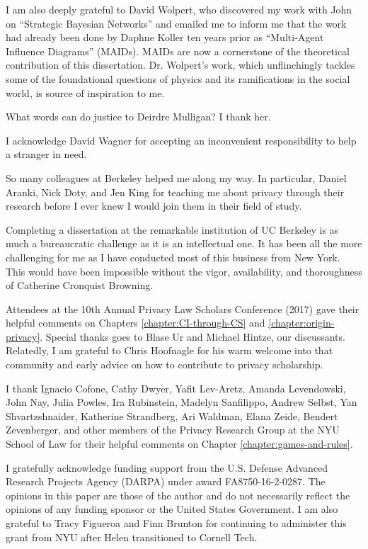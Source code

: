 \documentclass[../thesis.tex]{subfiles}
\begin{document}
 I am also deeply grateful to David Wolpert, who discovered
 my work with John on ``Strategic Bayesian Networks''
 and emailed me to inform me that the work had already
 been done by Daphne Koller ten years prior as
 ``Multi-Agent Influence Diagrams'' (MAIDs).
  MAIDs are now a cornerstone of the theoretical contribution
 of this dissertation.
 Dr. Wolpert's work, which unflinchingly tackles some
 of the foundational questions of physics and its ramifications
 in the social world, is source of inspiration to me.
 
 What words can do justice to Deirdre Mulligan?
 I thank her.

 I acknowledge David Wagner for accepting an
 inconvenient responsibility to help a stranger in need.

 So many colleagues at Berkeley helped me along my way.
 In particular, Daniel Aranki, Nick Doty, and Jen King
 for teaching me about privacy through their research
 before I ever knew I would join them in their field
 of study.

 Completing a dissertation at the remarkable institution
 of UC Berkeley is as much a bureaucratic challenge as it
 is an intellectual one.
 It has been all the more challenging for me as I
 have conducted most of this business from New York.
 This would have been impossible without the vigor,
 availability, and thoroughness of Catherine
 Cronquist Browning.
 
 Attendees at the 10th Annual Privacy Law Scholars Conference
 (2017) gave their helpful comments on
 Chapters \ref{chapter:CI-through-CS} and
 \ref{chapter:origin-privacy}.
 Special thanks goes to Blase Ur and Michael Hintze,
 our discussants.
 Relatedly, I am grateful to Chris Hoofnagle for his warm
 welcome into that community and early advice
 on how to contribute to privacy scholarship.

 I thank Ignacio Cofone, Cathy Dwyer, Yafit Lev-Aretz,
 Amanda Levendowski, John Nay, Julia Powles,
 Ira Rubinstein, Madelyn Sanfilippo, Andrew Selbst,
 Yan Shvartzshnaider,
 Katherine Strandberg, Ari Waldman, Elana Zeide,
 Bendert Zevenberger,  
 and other members of the Privacy Research Group at
 the NYU School of Law for their helpful comments
 on Chapter \ref{chapter:games-and-rules}.
 
 I gratefully acknowledge funding support 
 from the U.S. Defense Advanced Research Projects Agency (DARPA)
 under award FA8750-16-2-0287.
 The opinions in this paper are those of the author and do not
 necessarily reflect the opinions of any funding sponsor
 or the United States Government.
 I am also grateful to Tracy Figueroa and Finn Brunton
 for continuing to administer this grant from NYU after
 Helen transitioned to Cornell Tech.
 
\end{document}
